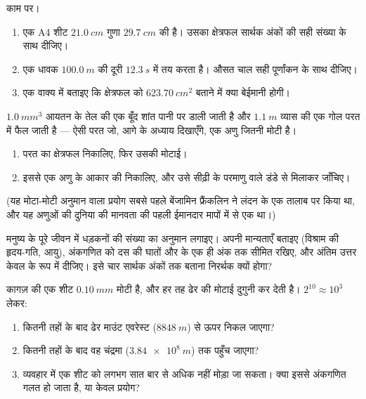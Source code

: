 \begin{exercise}[$\star\star$]\label{exo:g10:orders-of-magnitude:11}
 काम पर।
\begin{enumerate}
  \item एक A4 शीट $\qty{21.0}{cm}$ गुणा $\qty{29.7}{cm}$ की है। उसका क्षेत्रफल
        सार्थक अंकों की सही संख्या के साथ दीजिए।
  \item एक धावक $\qty{100.0}{m}$ की दूरी $\qty{12.3}{s}$ में तय करता है। औसत चाल सही
        पूर्णांकन के साथ दीजिए।
  \item एक वाक्य में बताइए कि क्षेत्रफल को $\qty{623.70}{cm^2}$ बताने में क्या
        बेईमानी होगी।
\end{enumerate}
\end{exercise}

\begin{exercise}[$\star\star\star$]\label{exo:g10:orders-of-magnitude:12}
$\qty{1.0}{mm^3}$ आयतन के तेल की एक बूँद शांत पानी पर डाली जाती है और $\qty{1.1}{m}$
व्यास की एक गोल परत में फैल जाती है --- ऐसी परत जो, आगे के अध्याय
दिखाएँगे, एक अणु जितनी मोटी है।
\begin{enumerate}
  \item परत का क्षेत्रफल निकालिए, फिर उसकी मोटाई।
  \item इससे एक अणु के आकार की  निकालिए, और उसे
        सीढ़ी के परमाणु वाले डंडे से मिलाकर जाँचिए।
\end{enumerate}
(यह मोटा-मोटी अनुमान वाला प्रयोग सबसे पहले बेंजामिन फ्रैंकलिन ने लंदन
के एक तालाब पर किया था, और यह अणुओं की दुनिया की मानवता की पहली ईमानदार
मापों में से एक था।)
\end{exercise}

\begin{exercise}[$\star\star\star$]\label{exo:g10:orders-of-magnitude:13}
मनुष्य के पूरे जीवन में धड़कनों की संख्या का अनुमान लगाइए। अपनी
मान्यताएँ बताइए (विश्राम की हृदय-गति, आयु), अंकगणित को दस की घातों और
 के एक ही अंक तक सीमित रखिए, और अंतिम उत्तर केवल
 के रूप में दीजिए। इसे चार सार्थक अंकों
तक बताना निरर्थक क्यों होगा?
\end{exercise}

\begin{exercise}[$\star\star\star$]\label{exo:g10:orders-of-magnitude:14}
कागज़ की एक शीट $\qty{0.10}{mm}$ मोटी है, और हर तह ढेर की मोटाई दुगुनी कर देती
है। $2^{10} \approx 10^{3}$ लेकर:
\begin{enumerate}
  \item कितनी तहों के बाद ढेर माउंट एवरेस्ट ($\qty{8848}{m}$) से ऊपर निकल
        जाएगा?
  \item कितनी तहों के बाद वह चंद्रमा ($\qty{3.84e8}{m}$) तक पहुँच जाएगा?
  \item व्यवहार में एक शीट को लगभग सात बार से अधिक नहीं मोड़ा जा सकता।
        क्या इससे अंकगणित गलत हो जाता है, या केवल प्रयोग?
\end{enumerate}
\end{exercise}

